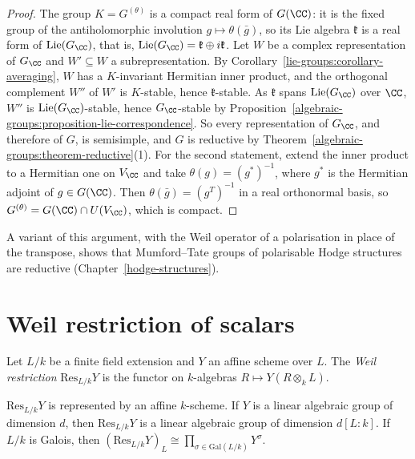 \begin{proof}
The group $K = G^{(\theta)}$ is a compact real form of $G(\CC)$: it is the fixed group of the antiholomorphic involution $g \mapsto \theta(\bar g)$, so its Lie algebra $\mathfrak{k}$ is a real
form of $\mathrm{Lie}(G_\CC)$, that is, $\mathrm{Lie}(G_\CC) = \mathfrak{k} \oplus i\mathfrak{k}$. Let $W$ be a complex representation of $G_\CC$ and $W' \subseteq W$ a subrepresentation. By
Corollary~\ref{lie-groups:corollary-averaging}, $W$ has a $K$-invariant Hermitian inner product, and the orthogonal complement $W''$ of $W'$ is $K$-stable, hence $\mathfrak{k}$-stable. As
$\mathfrak{k}$ spans $\mathrm{Lie}(G_\CC)$ over $\CC$, $W''$ is $\mathrm{Lie}(G_\CC)$-stable, hence $G_\CC$-stable by Proposition~\ref{algebraic-groups:proposition-lie-correspondence}. So
every representation of $G_\CC$, and therefore of $G$, is semisimple, and $G$ is reductive by Theorem~\ref{algebraic-groups:theorem-reductive}(1). For the second statement,
extend the inner product to a Hermitian one on $V_\CC$ and take $\theta(g) = (g^*)^{-1}$, where $g^*$ is the Hermitian adjoint of $g \in G(\CC)$. Then
$\theta(\bar g) = (g^T)^{-1}$ in a real orthonormal basis, so $G^{(\theta)} = G(\CC) \cap U(V_\CC)$, which is compact.
\end{proof}

\begin{remark}\label{algebraic-groups:remark-mumford-tate-reductive}
A variant of this argument, with the Weil operator of a polarisation in place of the transpose, shows that Mumford--Tate groups of polarisable Hodge structures are
reductive (Chapter~\ref{hodge-structures}).
\end{remark}

\section{Weil restriction of scalars}\label{algebraic-groups:section-weil-restriction}

\begin{definition}\label{algebraic-groups:definition-weil-restriction}
Let $L/k$ be a finite field extension and $Y$ an affine scheme over $L$. The \emph{Weil restriction} $\mathrm{Res}_{L/k}Y$ is the functor on $k$-algebras
$R \mapsto Y(R \otimes_kL)$.
\end{definition}

\begin{proposition}\label{algebraic-groups:proposition-weil-restriction}
$\mathrm{Res}_{L/k}Y$ is represented by an affine $k$-scheme. If $Y$ is a linear algebraic group of dimension $d$, then $\mathrm{Res}_{L/k}Y$ is a linear algebraic group of dimension
$d[L : k]$. If $L/k$ is Galois, then $(\mathrm{Res}_{L/k}Y)_L \cong \prod_{\sigma \in \mathrm{Gal}(L/k)}Y^\sigma$.
\end{proposition}


